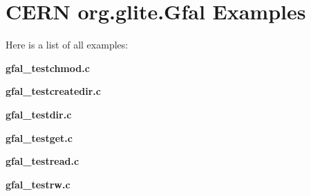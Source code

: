 \section{CERN org.glite.Gfal Examples}
Here is a list of all examples:\begin{CompactItemize}
\item 
\bf{gfal\_\-testchmod.c}
\item 
\bf{gfal\_\-testcreatedir.c}
\item 
\bf{gfal\_\-testdir.c}
\item 
\bf{gfal\_\-testget.c}
\item 
\bf{gfal\_\-testread.c}
\item 
\bf{gfal\_\-testrw.c}
\end{CompactItemize}

